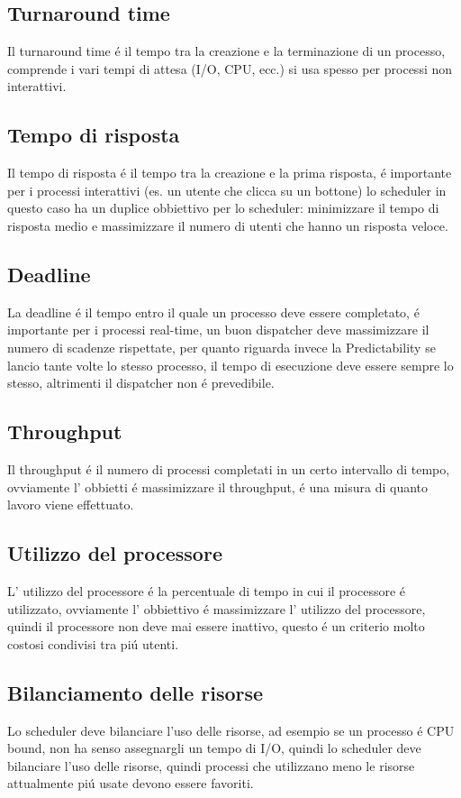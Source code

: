 \documentclass[11pt]{article}
\begin{document}
    \subsection{Turnaround time}
    Il turnaround time é il tempo tra la creazione e la terminazione di un processo, comprende i vari tempi di attesa (I/O, CPU, ecc.)
    si usa spesso per processi non interattivi.
    \subsection{Tempo di risposta}
    Il tempo di risposta é il tempo tra la creazione e la prima risposta, é importante per i processi interattivi (es. un utente che clicca su un bottone)
    lo scheduler in questo caso ha un duplice obbiettivo per lo scheduler: minimizzare il tempo di risposta medio
    e massimizzare il numero di utenti che hanno un risposta veloce.
    \subsection{Deadline}
    La deadline é il tempo entro il quale un processo deve essere completato, é importante per i processi real-time,
    un buon dispatcher deve massimizzare il numero di scadenze rispettate, per quanto riguarda invece la Predictability
    se lancio tante volte lo stesso processo, il tempo di esecuzione deve essere sempre lo stesso, altrimenti il
    dispatcher non é prevedibile.
    \subsection{Throughput}
    Il throughput é il numero di processi completati in un certo intervallo di tempo, ovviamente l' obbietti é massimizzare
    il throughput, é una misura di quanto lavoro viene effettuato.
    \subsection{Utilizzo del processore}
    L' utilizzo del processore é la percentuale di tempo in cui il processore é utilizzato, ovviamente l' obbiettivo é massimizzare
    l' utilizzo del processore, quindi il processore non deve mai essere inattivo, questo é un criterio molto costosi condivisi
    tra piú utenti.
    \subsection{Bilanciamento delle risorse}
    Lo scheduler deve bilanciare l'uso delle risorse, ad esempio se un processo é CPU bound, non ha senso assegnargli un
    tempo di I/O, quindi lo scheduler deve bilanciare l'uso delle risorse, quindi processi che utilizzano meno le risorse attualmente
    piú usate devono essere favoriti.
\end{document}
